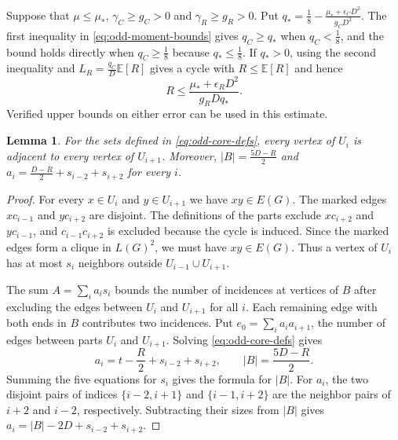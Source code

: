 \documentclass[preprint,11pt,numbers]{elsarticle-arxiv}
\numberwithin{equation}{section}
\newtheorem{lemma}[theorem]{Lemma}
\theoremstyle{definition}
\begin{document}
Suppose that $\mu\leq\mu_*$, $\gamma_C\geq g_C>0$ and
$\gamma_R\geq g_R>0$. Put
$q_*=\frac{1}{8}-\frac{\mu_*+\epsilon_C D^2}{g_C D^2}$.
The first inequality in \eqref{eq:odd-moment-bounds} gives
$q_C\geq q_*$ when $q_C<\frac{1}{8}$, and the bound holds directly
when $q_C\geq\frac{1}{8}$ because $q_*\leq\frac{1}{8}$. If $q_*>0$,
using the second inequality and $L_R=\frac{q_C}{D}\mathbb E[R]$
gives a cycle with $R\leq\mathbb E[R]$ and hence
\begin{equation}\label{eq:odd-choose-anchor}
 R\leq\frac{\mu_*+\epsilon_R D^2}{g_R Dq_*}.
\end{equation}
Verified upper bounds on either error can be used in this estimate.

\begin{lemma}\label{lem:simple-cycle-counts}
For the sets defined in \eqref{eq:odd-core-defs}, every vertex of
$U_i$ is adjacent to every vertex of $U_{i+1}$. Moreover,
$|B|=\frac{5D-R}{2}$ and $a_i=\frac{D-R}{2}+s_{i-2}+s_{i+2}$ for every $i$.
\end{lemma}

\begin{proof}
For every $x\in U_i$ and $y\in U_{i+1}$ we have $xy\in E(G)$. The
marked edges $xc_{i-1}$ and $yc_{i+2}$ are disjoint. The
definitions of the parts exclude $xc_{i+2}$ and $yc_{i-1}$, and
$c_{i-1}c_{i+2}$ is excluded because the cycle is induced. Since
the marked edges form a clique in $L(G)^2$, we must have
$xy\in E(G)$. Thus a vertex of $U_i$ has at most $s_i$ neighbors
outside $U_{i-1}\cup U_{i+1}$.

The sum $A=\sum_i a_i s_i$ bounds the number of incidences at vertices
of $B$ after excluding the edges between $U_i$ and $U_{i+1}$ for all
$i$. Each remaining edge with both ends in $B$ contributes two
incidences. Put $e_0=\sum_i a_i a_{i+1}$, the number of edges between
parts $U_i$ and $U_{i+1}$.
Solving \eqref{eq:odd-core-defs} gives
\begin{equation}\label{eq:odd-core-sums}
 a_i=t-\frac{R}{2}+s_{i-2}+s_{i+2},\qquad
 |B|=\frac{5D-R}{2}.
\end{equation}
Summing the five equations for $s_i$ gives the formula for $|B|$.
For $a_i$, the two disjoint pairs of indices
$\{i-2,i+1\}$ and $\{i-1,i+2\}$ are the neighbor pairs of
$i+2$ and $i-2$, respectively. Subtracting their sizes from $|B|$
gives $a_i=|B|-2D+s_{i-2}+s_{i+2}$.
\end{proof}
\end{document}
